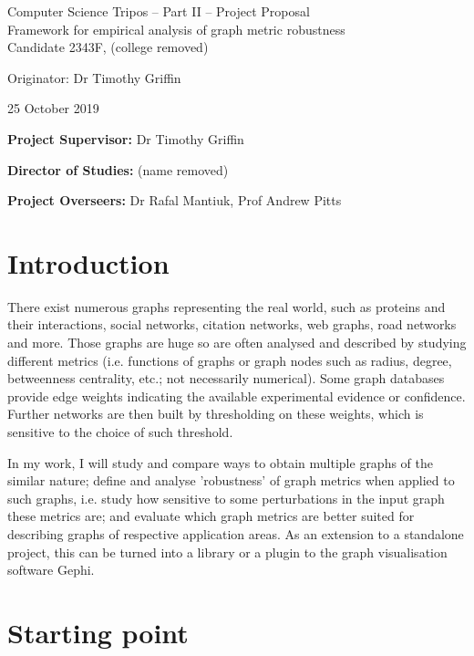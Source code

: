 \begin{center}
    \Large
    Computer Science Tripos -- Part II -- Project Proposal\\[4mm]
    \LARGE
    Framework for empirical analysis of graph metric robustness\\[4mm]

    \large
    Candidate 2343F, (college removed)

    Originator: Dr Timothy Griffin

    25 October 2019
\end{center}

\vspace{5mm}

\textbf{Project Supervisor:} Dr Timothy Griffin

\textbf{Director of Studies:} (name removed)

\textbf{Project Overseers:} Dr Rafal Mantiuk, Prof Andrew Pitts

\section*{Introduction}

There exist numerous graphs representing the real world, such as proteins and their interactions, social networks, citation networks, web graphs, road networks and more. Those graphs are huge so are often analysed and described by studying different metrics (i.e. functions of graphs or graph nodes such as radius, degree, betweenness centrality, etc.; not necessarily numerical). Some graph databases provide edge weights indicating the available experimental evidence or confidence. Further networks are then built by thresholding on these weights, which is sensitive to the choice of such threshold.

In my work, I will study and compare ways to obtain multiple graphs of the similar nature; define and analyse 'robustness' of graph metrics when applied to such graphs, i.e. study how sensitive to some perturbations in the input graph these metrics are; and evaluate which graph metrics are better suited for describing graphs of respective application areas. As an extension to a standalone project, this can be turned into a library or a plugin to the graph visualisation software Gephi.

\section*{Starting point}

